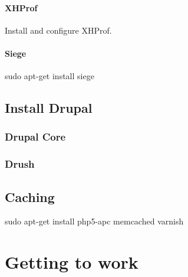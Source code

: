 \documentclass[draft,ebook,10pt,twoside,openright]{memoir}
\begin{document}
\subsection{XHProf}

Install and configure XHProf.

\subsection{Siege}

\begin{squashboxcommand}
sudo apt-get install siege
\end{squashboxcommand}

\chapter{Install Drupal} \label{chinstalldrupal}

\section{Drupal Core}

\section{Drush}

\chapter{Caching} \label{chcaching}

\begin{squashboxcommand}
sudo apt-get install php5-apc memcached varnish
\end{squashboxcommand}

\part{Getting to work}

\end{document}
